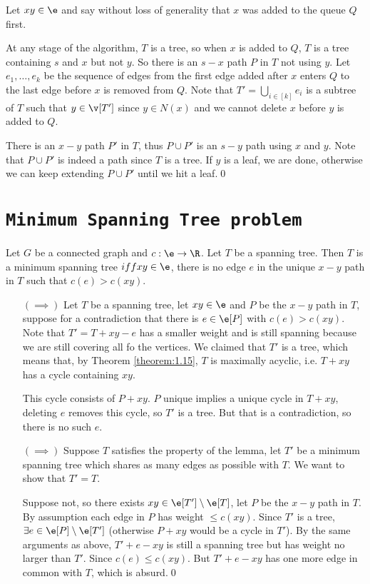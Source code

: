 \begin{prf}
    Let $xy \in \e$ and say without loss of generality that $x$ was added to the queue $Q$ first.

    At any stage of the algorithm, $T$ is a tree, so when $x$ is added to $Q$, $T$ is a tree containing $s$ and $x$ but not $y$. So there is an $s - x$ path $P$ in $T$ not using $y$. Let $e_1, \dots, e_k$ be the sequence of edges from the first edge added after $x$ enters $Q$ to the last edge before $x$ is removed from $Q$. Note that $T' = \bigcup_{i \in [k]}e_i$ is a subtree of $T$ such that $y \in \v[T']$ since $y \in N(x)$ and we cannot delete $x$ before $y$ is added to $Q$.

    There is an $x - y$ path $P'$ in $T$, thus $P \cup P'$ is an $s - y$ path using $x$ and $y$. Note that $P \cup P'$ is indeed a path since $T$ is a tree. If $y$ is a leaf, we are done, otherwise we can keep extending $P \cup P'$ until we hit a leaf.\qed
\end{prf}
\section{\texttt{Minimum Spanning Tree problem}}
\begin{lemma}
    \label{lemma:1.22}
    Let $G$ be a connected graph and $c: \e \rightarrow \R$. Let $T$ be a spanning tree. Then $T$ is a minimum spanning tree $iff xy \in \e$, there is no edge $e$ in the unique $x - y$ path in $T$ such that $c(e) > c(xy)$. 
\end{lemma}
\begin{prf}
    \begin{itemize}
        \item[$(\implies)$] Let $T$ be a spanning tree, let $xy \in \e$ and $P$ be the $x - y$ path in $T$, suppose for a contradiction that there is $e \in \e[P]$ with $c(e) > c(xy)$. Note that $T' = T + xy - e$ has a smaller weight and is still spanning because we are still covering all fo the vertices. We claimed that $T'$ is a tree, which means that, by Theorem \ref{theorem:1.15}, $T$ is maximally acyclic, i.e. $T + xy$ has a cycle containing $xy$.

        This cycle consists of $P + xy$. $P$ unique implies a unique cycle in $T + xy$, deleting $e$ removes this cycle, so $T'$ is a tree. But that is a contradiction, so there is no such $e$.
        \item[$(\implies)$] Suppose $T$ satisfies the property of the lemma, let $T'$ be a minimum spanning tree which shares as many edges as possible with $T$. We want to show that $T' = T$.
        
        Suppose not, so there exists $xy \in \e[T']\setminus\e[T]$, let $P$ be the $x - y$ path in $T$. By assumption each edge in $P$ has weight $\leq c(xy)$. Since $T'$ is a tree, $\exists e \in \e[P] \setminus \e[T']$ (otherwise $P + xy$ would be a cycle in $T'$). By the same arguments as above, $T' + e - xy$ is still a spanning tree but has weight no larger than $T'$. Since $c(e) \leq c(xy)$. But $T' + e - xy$ has one more edge in common with $T$, which is absurd.\qed
    \end{itemize}
\end{prf}
